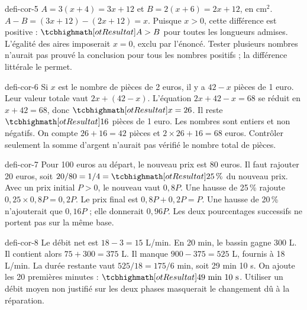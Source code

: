 \begin{blocEdition}{defi-cor-5}
$A=3(x+4)=3x+12$ et $B=2(x+6)=2x+12$, en cm$^2$.
$A-B=(3x+12)-(2x+12)=x$. Puisque $x>0$, cette différence est positive : $\res{A>B}$ pour toutes les longueurs admises.
L’égalité des aires imposerait $x=0$, exclu par l’énoncé. Tester plusieurs nombres n’aurait pas prouvé la conclusion pour tous les nombres positifs ; la différence littérale le permet.\label{fig-defi-cor-5}

\end{blocEdition}
\begin{blocEdition}{defi-cor-6}
Si $x$ est le nombre de pièces de 2 euros, il y a $42-x$ pièces de 1 euro. Leur valeur totale vaut $2x+(42-x)$.
L’équation $2x+42-x=68$ se réduit en $x+42=68$, donc $\res{x=26}$. Il reste $\res{16}$ pièces de 1 euro.
Les nombres sont entiers et non négatifs. On compte $26+16=42$ pièces et $2\times26+16=68$ euros. Contrôler seulement la somme d’argent n’aurait pas vérifié le nombre total de pièces.
\end{blocEdition}
\begin{blocEdition}{defi-cor-7}
Pour 100 euros au départ, le nouveau prix est 80 euros. Il faut rajouter 20 euros, soit $20/80=1/4=\res{25\,\%}$ du nouveau prix.
Avec un prix initial $P>0$, le nouveau vaut $0{,}8P$. Une hausse de 25\,\% rajoute $0{,}25\times0{,}8P=0{,}2P$. Le prix final est $0{,}8P+0{,}2P=P$.
Une hausse de 20\,\% n’ajouterait que $0{,}16P$ ; elle donnerait $0{,}96P$. Les deux pourcentages successifs ne portent pas sur la même base.
\end{blocEdition}
\begin{blocEdition}{defi-cor-8}
Le débit net est $18-3=15$ L/min. En 20 min, le bassin gagne 300 L. Il contient alors $75+300=375$ L.
Il manque $900-375=525$ L, fournis à 18 L/min. La durée restante vaut $525/18=175/6$ min, soit 29 min 10 s.
On ajoute les 20 premières minutes : $\res{49\text{ min }10\text{ s}}$. Utiliser un débit moyen non justifié sur les deux phases masquerait le changement dû à la réparation.
\end{blocEdition}
